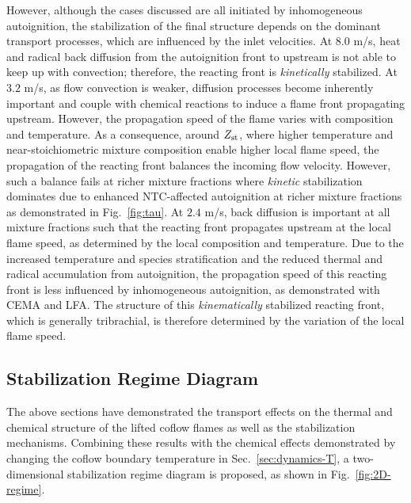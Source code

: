 However, although the cases discussed are all initiated by inhomogeneous autoignition, the stabilization of the final structure depends on the dominant transport processes, which are influenced by the inlet velocities.  At $8.0$ m/s, heat and radical back diffusion from the autoignition front to upstream is not able to keep up with convection; therefore, the reacting front is \emph{kinetically} stabilized.  At $3.2$ m/s, as flow convection is weaker, diffusion processes become inherently important and couple with chemical reactions to induce a flame front propagating upstream.  However, the propagation speed of the flame varies with composition and temperature.  As a consequence, around $Z_{\rm st}$, where higher temperature and near-stoichiometric mixture composition enable higher local flame speed, the propagation of the reacting front balances the incoming flow velocity.  However, such a balance fails at richer mixture fractions where \emph{kinetic} stabilization dominates due to enhanced NTC-affected autoignition at richer mixture fractions as demonstrated in Fig.~\ref{fig:tau}.  At $2.4$ m/s, back diffusion is important at all mixture fractions such that the reacting front propagates upstream at the local flame speed, as determined by the local composition and temperature.  Due to the increased temperature and species stratification and the reduced thermal and radical accumulation from autoignition, the propagation speed of this reacting front is less influenced by inhomogeneous autoignition, as demonstrated with CEMA and LFA.  The structure of this \emph{kinematically} stabilized reacting front, which is generally tribrachial, is therefore determined by the variation of the local flame speed. 

\subsection{Stabilization Regime Diagram}

The above sections have demonstrated the transport effects on the thermal and chemical structure of the lifted coflow flames as well as the stabilization mechanisms.  Combining these results with the chemical effects demonstrated by changing the coflow boundary temperature in Sec.~\ref{sec:dynamics-T}, a two-dimensional stabilization regime diagram is proposed, as shown in Fig.~\ref{fig:2D-regime}.  

